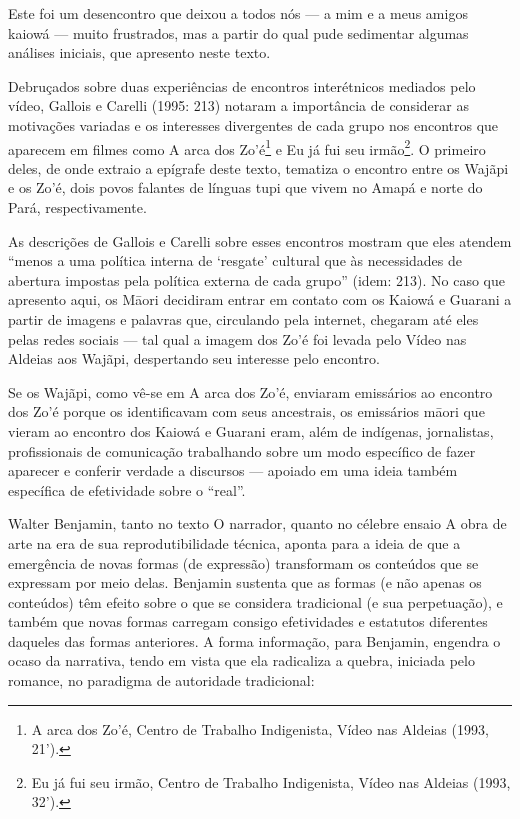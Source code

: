 \documentclass{article}
\begin{document}
Este foi um desencontro que deixou a todos n\'os --- a mim e a meus
amigos kaiow\'a --- muito frustrados, mas a partir do qual pude
sedimentar algumas an\'alises iniciais, que apresento neste texto. 

Debru\c{c}ados sobre duas experi\^encias de encontros inter\'etnicos
mediados pelo v\'ideo, Gallois e Carelli (1995: 213) notaram a
import\^ancia de considerar as motiva\c{c}\~oes variadas e os
interesses divergentes de cada grupo nos encontros que aparecem em
filmes como A arca dos Zo{\textquoteright}\'e\footnote{ A arca dos
Zo{\textquoteright}\'e, Centro de Trabalho Indigenista, V\'ideo nas
Aldeias (1993, 21{\textquoteright}).} e Eu j\'a fui seu
irm\~ao\footnote{ Eu j\'a fui seu irm\~ao, Centro de Trabalho
Indigenista, V\'ideo nas Aldeias (1993, 32{\textquoteright}).}. O
primeiro deles, de onde extraio a ep\'igrafe deste texto, tematiza o
encontro entre os Waj\~api e os Zo{\textquoteright}\'e, dois povos
falantes de l\'inguas tupi que vivem no Amap\'a e norte do Par\'a,
respectivamente.

As descri\c{c}\~oes de Gallois e Carelli sobre esses encontros mostram
que eles atendem {\textquotedblleft}menos a uma pol\'itica interna de
{\textquoteleft}resgate{\textquoteright} cultural que \`as necessidades
de abertura impostas pela pol\'itica externa de cada
grupo{\textquotedblright} (idem: 213). No caso que apresento aqui, os
M\=aori decidiram entrar em contato com os Kaiow\'a e Guarani a partir
de imagens e palavras que, circulando pela internet, chegaram at\'e
eles pelas redes sociais --- tal qual a imagem dos
Zo{\textquoteright}\'e foi levada pelo V\'ideo nas Aldeias aos
Waj\~api, despertando seu interesse pelo encontro.

Se os Waj\~api, como v\^e-se em A arca dos Zo{\textquoteright}\'e,
enviaram emiss\'arios ao encontro dos Zo{\textquoteright}\'e porque os
identificavam com seus ancestrais, os emiss\'arios m\=aori que vieram
ao encontro dos Kaiow\'a e Guarani eram, al\'em de ind\'igenas,
jornalistas, profissionais de comunica\c{c}\~ao trabalhando sobre um
modo espec\'ifico de fazer aparecer e conferir verdade a discursos ---
apoiado em uma ideia tamb\'em espec\'ifica de efetividade sobre o
{\textquotedblleft}real{\textquotedblright}.

Walter Benjamin, tanto no texto O narrador, quanto no c\'elebre ensaio A
obra de arte na era de sua reprodutibilidade t\'ecnica, aponta para a
ideia de que a emerg\^encia de novas formas (de express\~ao)
transformam os conte\'udos que se expressam por meio delas. Benjamin
sustenta que as formas (e n\~ao apenas os conte\'udos) t\^em efeito
sobre o que se considera tradicional (e sua perpetua\c{c}\~ao), e
tamb\'em que novas formas carregam consigo efetividades e estatutos
diferentes daqueles das formas anteriores. A forma informa\c{c}\~ao,
para Benjamin, engendra o ocaso da narrativa, tendo em vista que ela
radicaliza a quebra, iniciada pelo romance, no paradigma de autoridade
tradicional:
\end{document}
